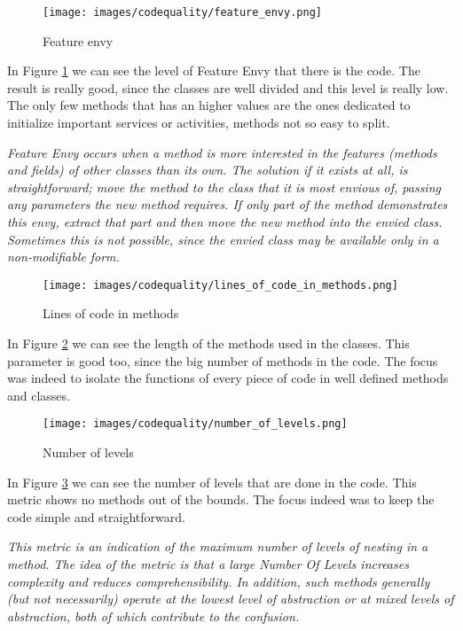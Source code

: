 \begin{figure}[H]
\centering %
\texttt{[image: images/codequality/feature\_envy.png]}
\caption{Feature envy}
\label{fig:featureEnvy}
\end{figure}

In Figure \ref{fig:featureEnvy} we can see the level of Feature Envy that there is the code. The result is really good, since the classes are well divided and this level is really low. The only few methods that has an higher values are the ones dedicated to initialize important services or activities, methods not so easy to split.

\textit{Feature Envy occurs when a method is more interested in the features (methods and fields) of other classes than its own. The solution if it exists at all, is straightforward; move the method to the class that it is most envious of, passing any parameters the new method requires. If only part of the method demonstrates this envy, extract that part and then move the new method into the envied class. Sometimes this is not possible, since the envied class may be available only in a non-modifiable form.}\cite{website:eclipse-metrics}\cite{website:eclipse-metrics}

\begin{figure}[H]
\centering %
\texttt{[image: images/codequality/lines\_of\_code\_in\_methods.png]}
\caption{Lines of code in methods}
\label{fig:linesOfCode}
\end{figure}

In Figure \ref{fig:linesOfCode} we can see the length of the methods used in the classes. This parameter is good too, since the big number of methods in the code. The focus was indeed to isolate the functions of every piece of code in well defined methods and classes.

\begin{figure}[H]
\centering %
\texttt{[image: images/codequality/number\_of\_levels.png]}
\caption{Number of levels}
\label{fig:numberOfLevels}
\end{figure}

In Figure \ref{fig:numberOfLevels} we can see the number of levels that are done in the code. This metric shows no methods out of the bounds. The focus indeed was to keep the code simple and straightforward.

\textit{This metric is an indication of the maximum number of levels of nesting in a method. The idea of the metric is that a large Number Of Levels increases complexity and reduces comprehensibility. In addition, such methods generally (but not necessarily) operate at the lowest level of abstraction or at mixed levels of abstraction, both of which contribute to the confusion.}\cite{website:eclipse-metrics}

